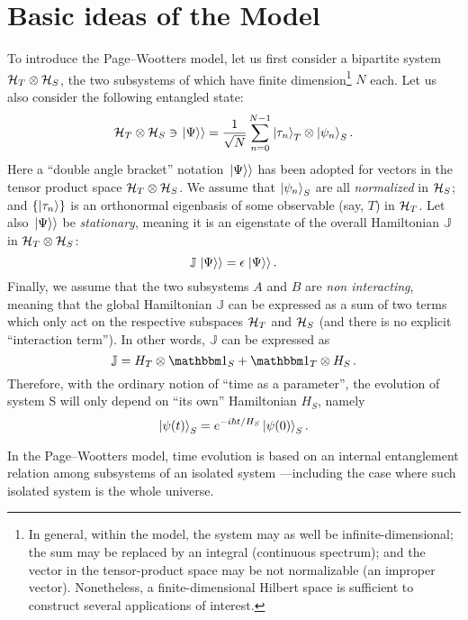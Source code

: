 \section{Basic ideas of the Model}

To introduce the Page--Wootters model, let us first consider
a bipartite system $\mathcal{H}_T \otimes \mathcal{H}_S$,
the two subsystems of which have finite dimension\footnote{
  In general, within the model,
  the system may as well be infinite-dimensional;
  the sum may be replaced by an integral (continuous spectrum);
  and the vector in the tensor-product space may be not normalizable (an improper vector).
  Nonetheless, a finite-dimensional Hilbert space is sufficient to construct several applications of interest.
} $N$ each.
Let us also consider the following entangled state:
\begin{equation}\label{eq:pw:finite-entanglement}
  \mathcal{H}_T \otimes \mathcal{H}_S \ni \left.\left| \Psi \right\rangle\right\rangle
  =
  \frac{1}{\sqrt{N}} \sum_{n=0}^{N-1} \ket{\tau_{n}}_{T} \otimes \ket{\psi_{n}}_{S} \text{.}
\end{equation}
Here
a ``double angle bracket'' notation $\left.\left| \Psi \right\rangle\right\rangle$ has been adopted
for vectors in the tensor product space $\mathcal{H}_T \otimes \mathcal{H}_S$.
We assume that $\ket{\psi_{n}}_{S}$ are all \emph{normalized} in $\mathcal{H}_S$;
and
$\qty{\ket{{\tau}_n}}$ is an orthonormal eigenbasis of some observable (say, $T$) in $\mathcal{H}_T$.
Let also $\left.\left| \Psi \right\rangle\right\rangle$ be \emph{stationary}, meaning it is an eigenstate
of the overall Hamiltonian $\mathbb{J}$ in $\mathcal{H}_T \otimes \mathcal{H}_S$:
$$
  \mathbb{J} \left.\left| \Psi \right\rangle\right\rangle = \epsilon \left.\left| \Psi \right\rangle\right\rangle \text{.}
$$
Finally, we assume that the two subsystems $A$ and $B$ are \emph{non interacting},
meaning that the global Hamiltonian $\mathbb{J}$ can be expressed as a sum of two terms
which only act on the respective subspaces $\mathcal{H}_T$ and $\mathcal{H}_S$
(and there is no explicit ``interaction term''). In other words,
$\mathbb{J}$ can be expressed as
$$
  \mathbb{J} = H_T \ox \idop_S + \idop_T \ox H_S \, \text{.} 
$$
Therefore, with the ordinary notion of ``time as a parameter'',
the evolution of system S will only depend on ``its own'' Hamiltonian $H_S$, namely
\begin{equation}\label{eq:pw:ordinary_S}
  \ket{\psi(t)}_S = e^{- i \hbar t / H_S } \ket{\psi(0)}_S \text{.}  
\end{equation}
 
In the Page--Wootters model, time evolution is based on an internal entanglement
relation among subsystems of an isolated system
---including the case where such isolated system is the whole universe.

